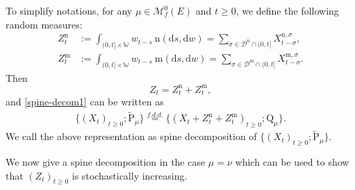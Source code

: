 \documentclass[12pt,a4paper]{amsart}
\numberwithin{equation}{section}
\theoremstyle{plain}
\theoremstyle{definition}
\theoremstyle{remark}
\begin{document}
{		To simplify notations, for any $\mu \in \mathcal M^0_f(E)$ and	$t\geq 0$,  we define the following random measures:
\begin{align}
	Z^{\mathrm n}_t
	&:= \int_{(0, t]\times \mathbb W} w_{t-s} ~\mathrm n (\mathrm ds, \mathrm dw)
	= \sum_{\sigma \in \mathcal D^\mathrm n \cap (0, t]} X^{\mathrm n,\sigma}_{t-\sigma},
	\\ Z^{\mathrm m}_t
	&:= \int_{(0, t]\times \mathbb W} w_{t-s} ~\mathrm m (\mathrm ds, \mathrm dw)
	= \sum_{\sigma \in \mathcal D^\mathrm m \cap (0, t]} X^{\mathrm m,\sigma}_{t-\sigma}.
  \end{align}
Then \begin{equation}\label{def-Zt}
Z_t= Z^{\mathrm n}_{t} + Z^{\mathrm m}_{t},
\end{equation}
 and \eqref{spine-decom1} can be written as
\begin{align}\label{spine-decom2}
	\{(X_t)_{t\geq 0}; \widetilde{\mathrm P}_\mu\}
	\overset{f.d.d.}{=}
	\{(X_t + Z^{\mathrm n}_{t} + Z^{\mathrm m}_{t} )_{t\geq 0}; \mathrm Q_\mu\}.
\end{align}
We call the above representation as spine decomposition of $\{(X_t)_{t\geq 0}; \widetilde{\mathrm P}_\mu\} $.

We now give a spine decomposition in the case $\mu=\nu$ which can be used to show that
$(Z_t)_{t\ge 0}$ is stochastically increasing.
}
\end{document}
